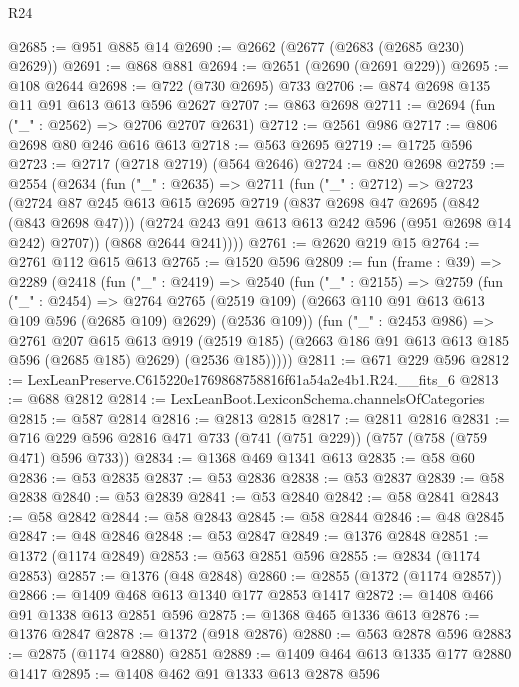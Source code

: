 \begin{lexlean}{R24}
\begin{coremodule}
@2685 := @951 @885 @14
@2690 := @2662 (@2677 (@2683 (@2685 @230) @2629))
@2691 := @868 @881
@2694 := @2651 (@2690 (@2691 @229))
@2695 := @108 @2644
@2698 := @722 (@730 @2695) @733
@2706 := @874 @2698 @135 @11 @91 @613 @613 @596 @2627
@2707 := @863 @2698
@2711 := @2694 (fun ("_" : @2562) => @2706 @2707 @2631)
@2712 := @2561 @986
@2717 := @806 @2698 @80 @246 @616 @613
@2718 := @563 @2695
@2719 := @1725 @596
@2723 := @2717 (@2718 @2719) (@564 @2646)
@2724 := @820 @2698
@2759 := @2554
    (@2634
      (fun ("_" : @2635) =>
      @2711
        (fun ("_" : @2712) =>
        @2723
          (@2724
            @87
            @245
            @613
            @615
            @2695
            @2719
            (@837 @2698 @47 @2695 (@842 (@843 @2698 @47)))
            (@2724 @243 @91 @613 @613 @242 @596 (@951 @2698 @14 @242) @2707))
          (@868 @2644 @241))))
@2761 := @2620 @219 @15
@2764 := @2761 @112 @615 @613
@2765 := @1520 @596
@2809 := fun (frame : @39) =>
  @2289
    (@2418
      (fun ("_" : @2419) =>
      @2540
        (fun ("_" : @2155) =>
        @2759
          (fun ("_" : @2454) =>
          @2764
            @2765
            (@2519 @109)
            (@2663 @110 @91 @613 @613 @109 @596 (@2685 @109) @2629)
            (@2536 @109))
          (fun ("_" : @2453 @986) =>
          @2761
            @207
            @615
            @613
            @919
            (@2519 @185)
            (@2663 @186 @91 @613 @613 @185 @596 (@2685 @185) @2629)
            (@2536 @185)))))
@2811 := @671 @229 @596
@2812 := LexLeanPreserve.C615220e1769868758816f61a54a2e4b1.R24.__fits_6
@2813 := @688 @2812
@2814 := LexLeanBoot.LexiconSchema.channelsOfCategories
@2815 := @587 @2814
@2816 := @2813 @2815
@2817 := @2811 @2816
@2831 := @716 @229 @596 @2816 @471 @733 (@741 (@751 @229)) (@757 (@758 (@759 @471) @596 @733))
@2834 := @1368 @469 @1341 @613
@2835 := @58 @60
@2836 := @53 @2835
@2837 := @53 @2836
@2838 := @53 @2837
@2839 := @58 @2838
@2840 := @53 @2839
@2841 := @53 @2840
@2842 := @58 @2841
@2843 := @58 @2842
@2844 := @58 @2843
@2845 := @58 @2844
@2846 := @48 @2845
@2847 := @48 @2846
@2848 := @53 @2847
@2849 := @1376 @2848
@2851 := @1372 (@1174 @2849)
@2853 := @563 @2851 @596
@2855 := @2834 (@1174 @2853)
@2857 := @1376 (@48 @2848)
@2860 := @2855 (@1372 (@1174 @2857))
@2866 := @1409 @468 @613 @1340 @177 @2853 @1417
@2872 := @1408 @466 @91 @1338 @613 @2851 @596
@2875 := @1368 @465 @1336 @613
@2876 := @1376 @2847
@2878 := @1372 (@918 @2876)
@2880 := @563 @2878 @596
@2883 := @2875 (@1174 @2880) @2851
@2889 := @1409 @464 @613 @1335 @177 @2880 @1417
@2895 := @1408 @462 @91 @1333 @613 @2878 @596

\end{coremodule}
\end{lexlean}
